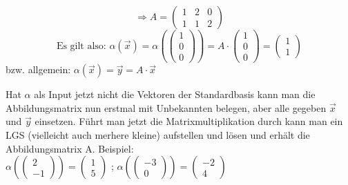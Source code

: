 \documentclass[a4paper,10pt]{scrartcl}
\begin{document}
            \[
                \Rightarrow A = 
                \begin{pmatrix}
                    1 & 2 & 0\\
                    1 & 1 & 2
                \end{pmatrix}
            \]
            \[
                \text{Es gilt also: }\alpha(\vec{x}) = \alpha(\begin{pmatrix} 1 \\ 0 \\ 0 \end{pmatrix}) 
                = A \cdot \begin{pmatrix} 1 \\ 0 \\ 0 \end{pmatrix} = \begin{pmatrix} 1 \\ 1 \end{pmatrix} 
            \] 
            bzw. allgemein: $\alpha(\vec{x}) = \vec{y} = A \cdot \vec{x}$ 
            
            Hat $\alpha$ als Input jetzt nicht die Vektoren der Standardbasis kann man die Abbildungsmatrix nun erstmal mit Unbekannten belegen, aber alle gegeben $\vec{x}$ und $\vec{y}$
            einsetzen. Führt man jetzt die Matrixmultiplikation durch kann man ein LGS (vielleicht auch merhere kleine) aufstellen und lösen und erhält die Abbildungsmatrix A. Beispiel: \\
            $
            \alpha(\begin{pmatrix}
                2 \\ -1
            \end{pmatrix}) = 
            \begin{pmatrix}
                1 \\ 5
            \end{pmatrix}$ ;
            $\alpha(
                \begin{pmatrix}
                -3 \\ 0
            \end{pmatrix}) = \begin{pmatrix}
                -2 \\ 4
            \end{pmatrix}$ 
\end{document}
